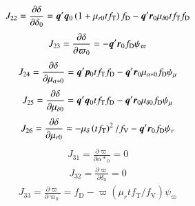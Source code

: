 \documentclass{aa}
\def\vec#1{\ensuremath{\mathchoice{\mbox{\boldmath$\displaystyle#1$}}
{\mbox{\boldmath$\textstyle#1$}}
{\mbox{\boldmath$\scriptstyle#1$}}
{\mbox{\boldmath$\scriptscriptstyle#1$}}}}
\begin{document}
\begin{equation*}
 \begin{aligned}
    J_{22}=\frac{\partial\delta}{\partial\delta_0}=
    \vec{q}'\vec{q}_0\left(1+\mu_{r0}tf_\mathrm{T}\right)f_\mathrm{D}
    -\vec{q}'\vec{r}_0\mu_{\delta0}tf_\mathrm{T}f_\mathrm{D}
 \end{aligned}
\end{equation*}
\begin{equation*}
 \begin{aligned}
    J_{23}=\frac{\partial\delta}{\partial\varpi_0}=
    -\vec{q}'\vec{r}_0f_\mathrm{D}\psi_\varpi
 \end{aligned}
\end{equation*}
\begin{equation*}
 \begin{aligned}
    J_{24}=\frac{\partial\delta}{\partial\mu_{\alpha*0}}=
    \vec{q}'\vec{p}_0tf_\mathrm{T}f_\mathrm{D}
    -\vec{q}'\vec{r}_0\mu_{\alpha*0}f_\mathrm{D}\psi_\mu
 \end{aligned}
\end{equation*}
\begin{equation*}
 \begin{aligned}
    J_{25}=\frac{\partial\delta}{\partial\mu_{\delta0}}=
    \vec{q}'\vec{q}_0tf_\mathrm{T}f_\mathrm{D}
    -\vec{q}'\vec{r}_0\mu_{\delta0}f_\mathrm{D}\psi_\mu
 \end{aligned}
\end{equation*}
\begin{equation*}
 \begin{aligned}
    J_{26}=\frac{\partial\delta}{\partial\mu_{r0}}=
    -\mu_{\delta}\left(tf_\mathrm{T}\right)^2/f_\mathrm V
    -\vec{q}'\vec{r}_0f_\mathrm{D}\psi_r
 \end{aligned}
\end{equation*}
\begin{equation*}
 \begin{aligned}
    J_{31}=\frac{\partial\varpi}{\partial{\alpha*}_0}=0
 \end{aligned}
\end{equation*}
\begin{equation*}
 \begin{aligned}
    J_{32}=\frac{\partial\varpi}{\partial\delta_0}=0
 \end{aligned}
\end{equation*}
\begin{equation*}
 \begin{aligned}
    J_{33}=\frac{\partial\varpi}{\partial\varpi_0}=
    f_\mathrm{D}
    -\varpi\left(\mu_rtf_\mathrm{T}/f_\mathrm{V}\right)\psi_\varpi
 \end{aligned}
\end{equation*}
\end{document}
